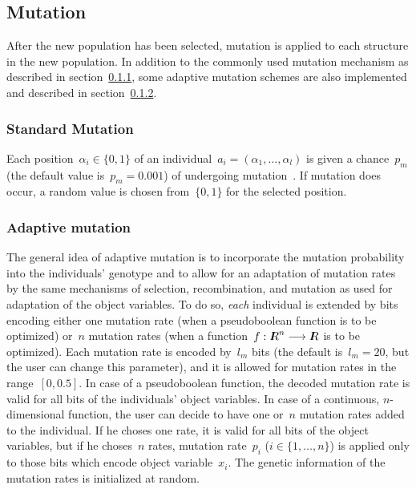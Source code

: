 \subsection{Mutation} 

After the new population has been selected, mutation is applied  to  
each  structure  in  the  new population.
In addition to the commonly used mutation mechanism as described in
section~\ref{mutation}, some adaptive mutation schemes are
also implemented and described in section~\ref{amut}.

\subsubsection{Standard Mutation}\label{mutation}

Each position~$\alpha_i \in \{0,1\}$ of an 
individual~$a_i = (\alpha_1,\ldots,\alpha_l)$ 
is given a  chance~$p_m$ (the default value is~$p_m = 0.001$) of 
undergoing  mutation~\cite{Hol75}.
If mutation does occur, a random value is chosen from~$\{0,1\}$ for
the selected position.   

\subsubsection{Adaptive mutation}\label{amut}

The general idea of adaptive mutation is to incorporate the mutation probability
into the individuals' genotype and to allow for an adaptation of mutation 
rates by the same mechanisms of selection, recombination, and mutation 
as used for adaptation of the object variables.
To do so, {\em each\/} individual is extended by bits encoding either
one mutation rate (when a pseudoboolean function is to be optimized)
or~$n$ mutation rates (when a function~$f: \Real^n \longrightarrow \Real$
is to be optimized).
Each mutation rate is encoded by~$l_m$ bits (the default is~$l_m = 20$, 
but the user can change this parameter), and it is allowed for mutation
rates in the range~$[0,0.5]$.
In case of a pseudoboolean function, the decoded mutation rate is valid for
all bits of the individuals' object variables.
In case of a continuous, $n$-dimensional function, the user can decide to have
one or~$n$ mutation rates added to the individual.
If he choses one rate, it is valid for all bits of the object variables,
but if he choses~$n$ rates, mutation rate~$p_i$ ($i \in \{1,\ldots,n\}$) 
is applied only to those bits which encode object variable~$x_i$.
The genetic information of the mutation rates is initialized at random.

